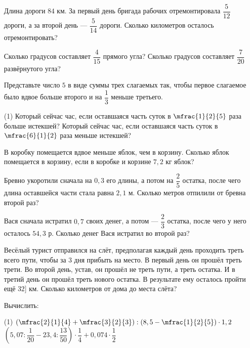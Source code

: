 %
%
\begin{class}[number=6]
	\begin{listofex}
		\item Длина дороги \(84\) км. За первый день бригада рабочих отремонтировала \(\dfrac{5}{12}\) дороги, а за второй день --- \(\dfrac{5}{14}\) дороги. Сколько километров осталось отремонтировать?
		\item Сколько градусов составляет \(\dfrac{4}{15}\) прямого угла? Сколько градусов составляет \(\dfrac{7}{20}\) развёрнутого угла?
		\item Представьте число \(5\) в виде суммы трех слагаемых так, чтобы первое слагаемое было вдвое больше второго и на \(\dfrac{1}{3}\) меньше третьего.
		\begin{tasks}(1)
			\task Который сейчас час, если оставшаяся часть суток в \(\mfrac{1}{2}{5}\) раза больше истекшей?
			\task Который сейчас час, если оставшаяся часть суток в \(\mfrac{6}{1}{2}\) раза меньше истекшей?
		\end{tasks}
		\item В коробку помещается вдвое меньше яблок, чем в корзину. Сколько яблок помещается в корзину, если в коробке и корзине \(7,2\) кг яблок?
		\item Бревно укоротили сначала на \(0,3\) его длины, а потом на \(\dfrac{2}{5}\)  остатка, после чего длина оставшейся части стала равна \(2,1\) м. Сколько метров отпилили от бревна второй раз?
		\item Вася сначала истратил \(0,7\) своих денег, а потом --- \(\dfrac{2}{3}\) остатка, после чего у него осталось \(54,3\) р. Сколько денег Вася истратил во второй раз?
		\item Весёлый турист отправился на слёт, предполагая каждый день проходить треть всего пути, чтобы за \(3\) дня прибыть на место. В первый день он прошёл треть трети. Во второй день, устав, он прошёл не треть пути, а треть остатка. И в третий день он прошёл треть нового остатка. В результате ему осталось пройти ещё \(32\)] км. Сколько километров от дома до места слёта?
		\item Вычислить:
		\begin{tasks}(1)
			\task \(\left(\mfrac{2}{1}{4}+\mfrac{3}{2}{3}\right):\left(8,5-\mfrac{1}{2}{5}\right) \cdot 1,2\)
			\task \(\left(5,07:\dfrac{1}{20}-23,4: \dfrac{13}{50}\right) \cdot \dfrac{1}{4} + 0,074 \cdot \dfrac{1}{2}\)
		\end{tasks}
	\end{listofex}
\end{class}

